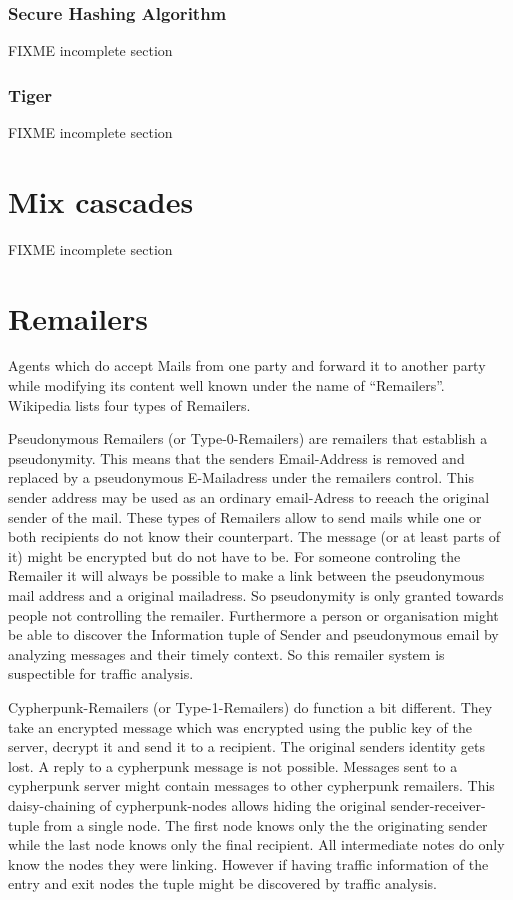 \subsubsection{Secure Hashing Algorithm}
FIXME incomplete section

\subsubsection{Tiger}
FIXME incomplete section

\section{Mix cascades}
FIXME incomplete section

\section{Remailers}
Agents which do accept Mails from one party and forward it to another party while modifying its content well known under the name of ``Remailers''. Wi\-ki\-pe\-dia \cite{wiki:remailer} lists four types of Remailers.\par

Pseudonymous Remailers (or Type-0-Remailers) are remailers that establish a pseu\-do\-ny\-mi\-ty. This means that the senders Email-Address is removed and replaced by a pseudonymous E-Mailadress under the remailers control. This sender address may be used as an ordinary email-Adress to reeach the original sender of the mail. These types of Remailers allow to send mails while one or both recipients do not know their counterpart. The message (or at least parts of it) might be encrypted but do not have to be. For someone controling the Remailer it will always be possible to make a link between the pseudonymous mail address and a original mailadress. So pseudonymity is only granted towards people not controlling the remailer. Furthermore a person or organisation might be able to discover the Information tuple of Sender and pseudonymous email by analyzing messages and their timely context. So this remailer system is suspectible for traffic analysis.\par

Cypherpunk-Remailers (or Type-1-Remailers) do function a bit different. They take an encrypted message which was encrypted using the public key of the server, decrypt it and send it to a recipient. The original senders identity gets lost. A reply to a cypherpunk message is not possible. Messages sent to a cypherpunk server might contain messages to other cypherpunk remailers. This daisy-chaining of cypherpunk-nodes allows hiding the original sender-receiver-tuple from a single node. The first node knows only the the originating sender while the last node knows only the final recipient. All intermediate notes do only know the nodes they were linking. However if having traffic information of the entry and exit nodes the tuple might be discovered by traffic analysis.\par

